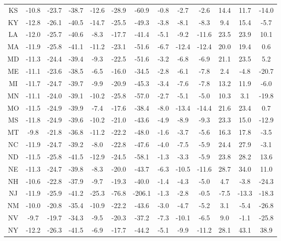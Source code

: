 \begin{table}
\begin{tabular}{ccccccccccccc}
   KS & -10.8 & -23.7 & -38.7 & -12.6 & -28.9 &  -60.9 & -0.8 &  -2.7 &  -2.6 & 14.4 &  11.7 & -14.0 \\
   KY & -12.8 & -26.1 & -40.5 & -14.7 & -25.5 &  -49.3 & -3.8 &  -8.1 &  -8.3 &  9.4 &  15.4 &  -5.7 \\
   LA & -12.0 & -25.7 & -40.6 &  -8.3 & -17.7 &  -41.4 & -5.1 &  -9.2 & -11.6 & 23.5 &  23.9 &  10.1 \\
   MA & -11.9 & -25.8 & -41.1 & -11.2 & -23.1 &  -51.6 & -6.7 & -12.4 & -12.4 & 20.0 &  19.4 &   0.6 \\
   MD & -11.3 & -24.4 & -39.4 &  -9.3 & -22.5 &  -51.6 & -3.2 &  -6.8 &  -6.9 & 21.1 &  23.5 &   5.2 \\
   ME & -11.1 & -23.6 & -38.5 &  -6.5 & -16.0 &  -34.5 & -2.8 &  -6.1 &  -7.8 &  2.4 &  -4.8 & -20.7 \\
   MI & -11.7 & -24.7 & -39.7 &  -9.9 & -20.9 &  -45.3 & -3.4 &  -7.6 &  -7.8 & 13.2 &  11.9 &  -6.0 \\
   MN & -11.1 & -24.0 & -39.1 & -10.2 & -25.8 &  -57.0 & -2.7 &  -5.1 &  -5.0 & 10.3 &   3.1 & -19.8 \\
   MO & -11.5 & -24.9 & -39.9 &  -7.4 & -17.6 &  -38.4 & -8.0 & -13.4 & -14.4 & 21.6 &  23.4 &   0.7 \\
   MS & -11.8 & -24.9 & -39.6 & -10.2 & -21.0 &  -43.6 & -4.9 &  -8.9 &  -9.3 & 23.3 &  15.0 & -12.9 \\
   MT &  -9.8 & -21.8 & -36.8 & -11.2 & -22.2 &  -48.0 & -1.6 &  -3.7 &  -5.6 & 16.3 &  17.8 &  -3.5 \\
   NC & -11.9 & -24.7 & -39.2 &  -8.0 & -22.8 &  -47.6 & -4.0 &  -7.5 &  -5.9 & 24.4 &  27.9 &  -3.1 \\
   ND & -11.5 & -25.8 & -41.5 & -12.9 & -24.5 &  -58.1 & -1.3 &  -3.3 &  -5.9 & 23.8 &  28.2 &  13.6 \\
   NE & -11.3 & -24.7 & -39.8 &  -8.3 & -20.0 &  -43.7 & -6.3 & -10.5 & -11.6 & 28.7 &  34.0 &  11.0 \\
   NH & -10.6 & -22.8 & -37.9 &  -9.7 & -19.3 &  -40.0 & -1.4 &  -4.3 &  -5.0 &  4.7 &  -3.8 & -24.3 \\
   NJ & -11.9 & -25.9 & -41.2 & -25.3 & -76.8 & -206.1 & -1.3 &  -2.8 &  -0.5 & -7.5 & -13.3 & -18.3 \\
   NM & -10.0 & -20.8 & -35.4 & -10.9 & -22.2 &  -43.6 & -3.0 &  -4.7 &  -5.2 &  3.1 &  -5.4 & -26.8 \\
   NV &  -9.7 & -19.7 & -34.3 &  -9.5 & -20.3 &  -37.2 & -7.3 & -10.1 &  -6.5 &  9.0 &  -1.1 & -25.8 \\
   NY & -12.2 & -26.3 & -41.5 &  -6.9 & -17.7 &  -44.2 & -5.1 &  -9.9 & -11.2 & 28.1 &  43.1 &  38.9 \\

\end{tabular}
\end{table}
